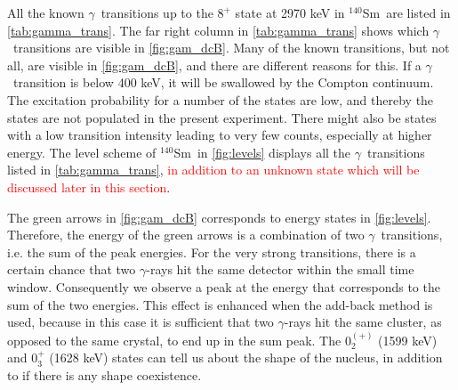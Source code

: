 \documentclass[twoside,english]{uiofysmaster/uiofysmaster}
\newcommand{\Sm}{$^{140}$Sm} %
\newcommand{\ga}{$\gamma$}
\let\orgautoref\autoref
\renewcommand{\autoref}
        {%
		 \def\sectionautorefname{Section}%
		 \def\subsectionautorefname{Section}%
		 \def\subsubsectionautorefname{Section}%
		 \def\chapterautorefname{Chapter}%
          \orgautoref}
\begin{document}
All the known \ga\ transitions up to the $8^+$ state at 2970 keV in \Sm\ are listed in \autoref{tab:gamma_trans}. 
The far right column in \autoref{tab:gamma_trans} shows which \ga\ transitions are visible in \autoref{fig:gam_dcB}.
Many of the known transitions, but not all, are visible in \autoref{fig:gam_dcB}, and there are different reasons for this.
If a \ga\ transition is below 400 keV, it will be swallowed by the Compton continuum.
The excitation probability for a number of the states are low, and thereby the states are not populated in the present experiment.
There might also be states with a low transition intensity leading to very few counts, especially at higher energy.
The level scheme of \Sm\ in \autoref{fig:levels} displays all the \ga\ transitions listed in  \autoref{tab:gamma_trans}, \textcolor{red}{in addition to an unknown state which will be discussed later in this section}. 


\begin{table}[ht] 
    \centering 
    \caption{Known \ga\ transitions in \Sm\ based on \cite{Klintefjord, NNDC-levels}. 
    $E$ refers to the energy, $J^\pi$ is the spin and parity and $\sigma \lambda$ is the multipolarity. 
    $I_\gamma$ is the relative \ga\ intensity for transitions depopulating a given state, where the strongest transition is normalized to intensity 100.
    The column "Visible in \ga\ spectrum" describes if it is possible to see the transition in \autoref{fig:gam_dcB}.}
	
	\label{tab:gamma_trans}
\end{table}


The green arrows in \autoref{fig:gam_dcB} corresponds to energy states in \autoref{fig:levels}. 
Therefore, the energy of the green arrows is a combination of two \ga\ transitions, i.e. the sum of the peak energies.
For the very strong transitions, there is a certain chance that two \ga-rays hit the same detector within the small time window. 
Consequently we observe a peak at the energy that corresponds to the sum of the two energies.
This effect is enhanced when the add-back method is used, because in this case it is sufficient that two \ga-rays hit the same cluster, as opposed to the same crystal, to end up in the sum peak.
The $0_2^{(+)}$ (1599 keV) and $0_3^{+}$ (1628 keV) states can tell us about the shape of the nucleus, in addition to if there is any shape coexistence. 
\end{document}
